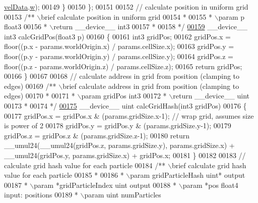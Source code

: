 \begin{DoxyCode}
      \hyperlink{structintegrate__functor_a772e86ead8690332beb50911e4448f81}{velData}.\hyperlink{structintegrate__functor_a772e86ead8690332beb50911e4448f81}{w});
00149     \}
00150 \};
00151 
00152 \textcolor{comment}{// calculate position in uniform grid}
00153 \textcolor{comment}{/** \(\backslash\)brief calculate position in uniform grid}
00154 \textcolor{comment}{ *}
00155 \textcolor{comment}{ * \(\backslash\)param p float3}
00156 \textcolor{comment}{ * \(\backslash\)return \_\_device\_\_ int3}
00157 \textcolor{comment}{ *}
00158 \textcolor{comment}{ */}
\hypertarget{particles__kernel__impl_8cuh_source_l00159}{}\hyperlink{particles__kernel__impl_8cuh_a63d62750e6cbb8781c5ff252fc13c1fd}{00159} \_\_device\_\_ int3 calcGridPos(float3 p)
00160 \{
00161     int3 gridPos;
00162     gridPos.x = floor((p.x - params.worldOrigin.x) / params.cellSize.x);
00163     gridPos.y = floor((p.y - params.worldOrigin.y) / params.cellSize.y);
00164     gridPos.z = floor((p.z - params.worldOrigin.z) / params.cellSize.z);
00165     \textcolor{keywordflow}{return} gridPos;
00166 \}
00167 
00168 \textcolor{comment}{// calculate address in grid from position (clamping to edges)}
00169 \textcolor{comment}{/** \(\backslash\)brief calculate address in grid from position (clamping to edges)}
00170 \textcolor{comment}{ *}
00171 \textcolor{comment}{ * \(\backslash\)param gridPos int3}
00172 \textcolor{comment}{ * \(\backslash\)return \_\_device\_\_ uint}
00173 \textcolor{comment}{ *}
00174 \textcolor{comment}{ */}
\hypertarget{particles__kernel__impl_8cuh_source_l00175}{}\hyperlink{particles__kernel__impl_8cuh_ad20ac253847311c176aacf9a224e14e5}{00175} \_\_device\_\_ uint calcGridHash(int3 gridPos)
00176 \{
00177     gridPos.x = gridPos.x & (params.gridSize.x-1);  \textcolor{comment}{// wrap grid, assumes size is power of 2}
00178     gridPos.y = gridPos.y & (params.gridSize.y-1);
00179     gridPos.z = gridPos.z & (params.gridSize.z-1);
00180     \textcolor{keywordflow}{return} \_\_umul24(\_\_umul24(gridPos.z, params.gridSize.y), params.gridSize.x) + \_\_umul24(gridPos.y, 
      params.gridSize.x) + gridPos.x;
00181 \}
00182 
00183 \textcolor{comment}{// calculate grid hash value for each particle}
00184 \textcolor{comment}{/** \(\backslash\)brief calculate grid hash value for each particle}
00185 \textcolor{comment}{ *}
00186 \textcolor{comment}{ * \(\backslash\)param gridParticleHash uint* output}
00187 \textcolor{comment}{ * \(\backslash\)param *gridParticleIndex uint output}
00188 \textcolor{comment}{ * \(\backslash\)param *pos float4 input: positions}
00189 \textcolor{comment}{ * \(\backslash\)param  uint    numParticles}

\end{DoxyCode}
